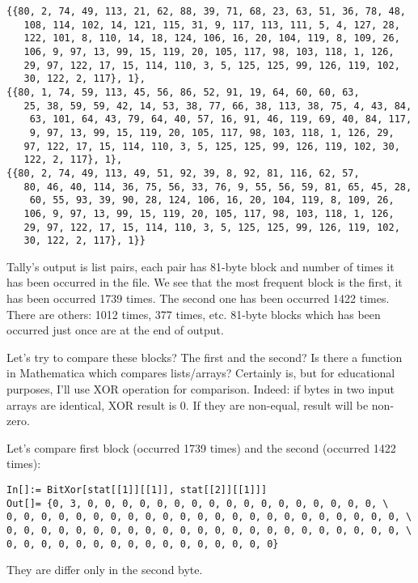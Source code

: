 \begin{lstlisting}
{{80, 2, 74, 49, 113, 21, 62, 88, 39, 71, 68, 23, 63, 51, 36, 78, 48, 
   108, 114, 102, 14, 121, 115, 31, 9, 117, 113, 111, 5, 4, 127, 28, 
   122, 101, 8, 110, 14, 18, 124, 106, 16, 20, 104, 119, 8, 109, 26, 
   106, 9, 97, 13, 99, 15, 119, 20, 105, 117, 98, 103, 118, 1, 126, 
   29, 97, 122, 17, 15, 114, 110, 3, 5, 125, 125, 99, 126, 119, 102, 
   30, 122, 2, 117}, 1},
{{80, 1, 74, 59, 113, 45, 56, 86, 52, 91, 19, 64, 60, 60, 63, 
   25, 38, 59, 59, 42, 14, 53, 38, 77, 66, 38, 113, 38, 75, 4, 43, 84,
    63, 101, 64, 43, 79, 64, 40, 57, 16, 91, 46, 119, 69, 40, 84, 117,
    9, 97, 13, 99, 15, 119, 20, 105, 117, 98, 103, 118, 1, 126, 29, 
   97, 122, 17, 15, 114, 110, 3, 5, 125, 125, 99, 126, 119, 102, 30, 
   122, 2, 117}, 1},
{{80, 2, 74, 49, 113, 49, 51, 92, 39, 8, 92, 81, 116, 62, 57, 
   80, 46, 40, 114, 36, 75, 56, 33, 76, 9, 55, 56, 59, 81, 65, 45, 28,
    60, 55, 93, 39, 90, 28, 124, 106, 16, 20, 104, 119, 8, 109, 26, 
   106, 9, 97, 13, 99, 15, 119, 20, 105, 117, 98, 103, 118, 1, 126, 
   29, 97, 122, 17, 15, 114, 110, 3, 5, 125, 125, 99, 126, 119, 102, 
   30, 122, 2, 117}, 1}}
\end{lstlisting}

Tally's output is list pairs, each pair has 81-byte block and number of times it has been occurred in the file.
We see that the most frequent block is the first, it has been occurred 1739 times.
The second one has been occurred 1422 times. There are others: 1012 times, 377 times, etc.
81-byte blocks which has been occurred just once are at the end of output.

Let's try to compare these blocks? The first and the second?
Is there a function in Mathematica which compares lists/arrays? Certainly is, but for educational purposes, I'll use XOR operation for comparison.
Indeed: if bytes in two input arrays are identical, XOR result is 0. If they are non-equal, result will be non-zero.

Let's compare first block (occurred 1739 times) and the second (occurred 1422 times):

\begin{lstlisting}
In[]:= BitXor[stat[[1]][[1]], stat[[2]][[1]]]
Out[]= {0, 3, 0, 0, 0, 0, 0, 0, 0, 0, 0, 0, 0, 0, 0, 0, 0, 0, 0, \
0, 0, 0, 0, 0, 0, 0, 0, 0, 0, 0, 0, 0, 0, 0, 0, 0, 0, 0, 0, 0, 0, 0, \
0, 0, 0, 0, 0, 0, 0, 0, 0, 0, 0, 0, 0, 0, 0, 0, 0, 0, 0, 0, 0, 0, 0, \
0, 0, 0, 0, 0, 0, 0, 0, 0, 0, 0, 0, 0, 0, 0, 0}
\end{lstlisting}

They are differ only in the second byte.

